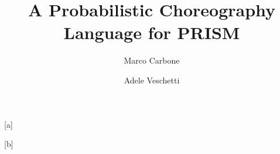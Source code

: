 \documentclass{lmcs} %
\theoremstyle{plain}\newtheorem{satz}[thm]{Satz} %
\def\eg{{\em e.g.}}
\begin{document}
\title[A Probabilistic Choreography Language for PRISM]
{A Probabilistic Choreography Language for PRISM}

\author[M.~Carbone]{Marco Carbone}[a]
\author[A.~Veschetti]{Adele Veschetti}[b]

\address{Computer Science Department, IT University of Copenhagen, Rued Langgaards Vej 7, 2300 Copenhagen S, Denmark}	%

\address{ADELE FALLO TU PERCHE NON CONOSCO THE MOST RECENT INFO} %




\end{document}
